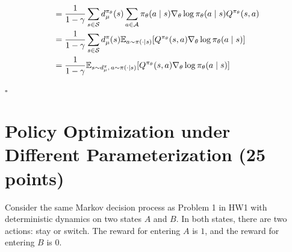 \begin{Solution}
\begin{enumerate} [label=\alph*)]
$$\begin{aligned}
        & = \dfrac{1}{1 - \gamma} \sum_{s \in \mathcal{S}}  d_\mu^{\pi_{\theta}}(s) \sum_{a \in \mathcal{A}} \pi_{\theta}(a \mid s) \nabla_\theta \log{\pi_{\theta}(a \mid s)} Q^{\pi_\theta}(s,a)  \\
        & = \dfrac{1}{1 - \gamma} \sum_{s \in \mathcal{S}}  d_\mu^\pi(s) \mathbb{E}_{a \sim \pi(\cdot \mid s)} {\left[Q^{\pi_\theta}(s,a) \nabla_\theta \log{\pi_{\theta}(a \mid s)}\right]} \\
        & = \frac{1}{1-\gamma}\mathbb{E}_{s\sim d_{\mu}^{\pi},\,a\sim\pi(\cdot | s)}{\left[Q^{\pi_\theta}(s,a) \nabla_\theta \log{\pi_{\theta}(a \mid s)}\right]}
        \end{aligned}
        $$ \begin{flushright} $\square$ \end{flushright}
    \end{enumerate}
\end{Solution}






\clearpage



\section{Policy Optimization under Different Parameterization (25 points)}
Consider the same Markov decision process as Problem 1 in HW1 with deterministic dynamics on two states $A$
  and $B$. In both states, there are two actions: stay or switch.
  The reward for entering $A$ is $1$, and the reward for entering $B$ is $0$.

